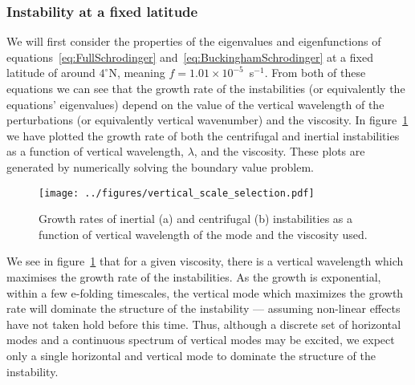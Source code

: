 \subsubsection{Instability at a fixed latitude}
We will first consider the properties of the eigenvalues and eigenfunctions of equations~\ref{eq:FullSchrodinger} and~\ref{eq:BuckinghamSchrodinger} at a fixed latitude of around $4^\circ$N, meaning $f = 1.01 \times 10^{-5}$~s$^{-1}$. From both of these equations we can see that the growth rate of the instabilities (or equivalently the equations' eigenvalues) depend on the value of the vertical wavelength of the perturbations (or equivalently vertical wavenumber) and the viscosity. In figure~\ref{fig:DispersionRelation} we have plotted the growth rate of both the centrifugal and inertial instabilities as a function of vertical wavelength, $\lambda$, and the viscosity. These plots are generated by numerically solving the boundary value problem.

\begin{figure}
    \centering
    \texttt{[image: ../figures/vertical\_scale\_selection.pdf]}
    \caption{Growth rates of inertial (a) and centrifugal (b) instabilities as a function of vertical wavelength of the mode and the viscosity used.}
    \label{fig:DispersionRelation}
\end{figure}

We see in figure~\ref{fig:DispersionRelation} that for a given viscosity, there is a vertical wavelength which maximises the growth rate of the instabilities. As the growth is exponential, within a few e-folding timescales, the vertical mode which maximizes the growth rate will dominate the structure of the instability --- assuming non-linear effects have not taken hold before this time. Thus, although a discrete set of horizontal modes and a continuous spectrum of vertical modes may be excited, we expect only a single horizontal and vertical mode to dominate the structure of the instability.


